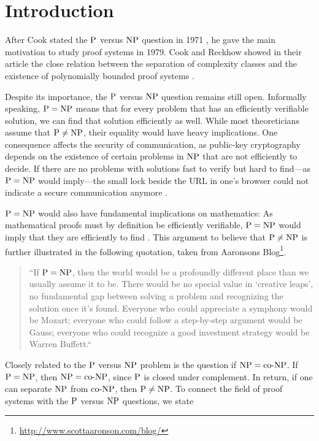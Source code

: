 \chapter{Introduction}
  After Cook stated the \(\P\) versus \(\NP\) question in 1971 \cite{C71}, he gave the main motivation to study proof systems in 1979. Cook and Reckhow showed in their article the close relation between the separation of complexity classes and the existence of polynomially bounded proof systems \cite{CR79}.

  Despite its importance, the \(\P\) versus \(\NP\) question remains still open. Informally speaking, \(\P = \NP\) means that for every problem that has an efficiently verifiable solution, we can find that solution efficiently as well. While most theoreticians assume that \(\P \neq \NP\), their equality would have heavy implications. One consequence affects the security of communication, as public-key cryptography depends on the existence of certain problems in \(\NP\) that are not efficiently to decide. If there are no problems with solutions fast to verify but hard to find---as \(\P = \NP\) would imply---the small lock beside the URL in one's browser could not indicate a secure communication anymore \cite{F09}.

  \(\P = \NP\) would also have fundamental implications on mathematics: As mathematical proofs must by definition be efficiently verifiable, \(\P = \NP\) would imply that they are efficiently to find \cite{CR79}. This argument to believe that \(\P \neq \NP\) is further illustrated in the following quotation, taken from Aaronsons Blog\footnote{\url{http://www.scottaaronson.com/blog/}}.

  \begin{quotation}
    ``If \(\P=\NP\), then the world would be a profoundly different place than we usually assume it to be. There would be no special value in `creative leaps', no fundamental gap between solving a problem and recognizing the solution once it's found. Everyone who could appreciate a symphony would be Mozart; everyone who could follow a step-by-step argument would be Gauss; everyone who could recognize a good investment strategy would be Warren Buffett.``
  \end{quotation}

  Closely related to the \(\P\) versus \(\NP\) problem is the question if \(\NP = \coNP\). If \(\P = \NP\), then \(\NP = \coNP\), since \(\P\) is closed under complement. In return, if one can separate \(\NP\) from \(\coNP\), then \(\P \neq \NP\). To connect the field of proof systems with the \(\P\) versus \(\NP\) questions, we state

